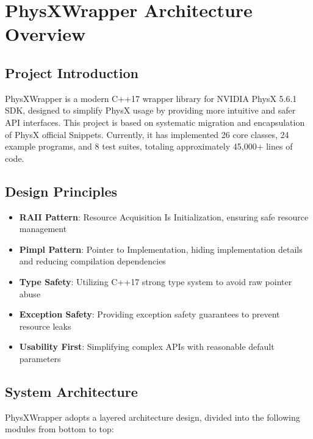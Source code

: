 \section{PhysXWrapper Architecture Overview}

\subsection{Project Introduction}

PhysXWrapper is a modern C++17 wrapper library for NVIDIA PhysX 5.6.1 SDK, designed to simplify PhysX usage by providing more intuitive and safer API interfaces. This project is based on systematic migration and encapsulation of PhysX official Snippets. Currently, it has implemented 26 core classes, 24 example programs, and 8 test suites, totaling approximately 45,000+ lines of code.

\subsection{Design Principles}

\begin{itemize}
    \item \textbf{RAII Pattern}: Resource Acquisition Is Initialization, ensuring safe resource management
    \item \textbf{Pimpl Pattern}: Pointer to Implementation, hiding implementation details and reducing compilation dependencies
    \item \textbf{Type Safety}: Utilizing C++17 strong type system to avoid raw pointer abuse
    \item \textbf{Exception Safety}: Providing exception safety guarantees to prevent resource leaks
    \item \textbf{Usability First}: Simplifying complex APIs with reasonable default parameters
\end{itemize}

\subsection{System Architecture}

PhysXWrapper adopts a layered architecture design, divided into the following modules from bottom to top:

